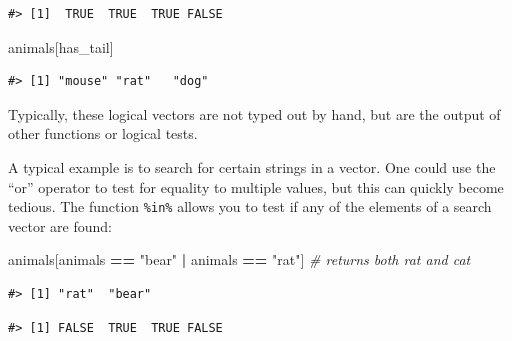 \documentclass[]{book}
\newenvironment{Shaded}{\begin{snugshade}}{\end{snugshade}}
\newcommand{\KeywordTok}[1]{\textcolor[rgb]{0.13,0.29,0.53}{\textbf{#1}}}
\newcommand{\StringTok}[1]{\textcolor[rgb]{0.31,0.60,0.02}{#1}}
\newcommand{\CommentTok}[1]{\textcolor[rgb]{0.56,0.35,0.01}{\textit{#1}}}
\newcommand{\OperatorTok}[1]{\textcolor[rgb]{0.81,0.36,0.00}{\textbf{#1}}}
\newcommand{\NormalTok}[1]{#1}
\theoremstyle{definition}
\theoremstyle{definition}
\theoremstyle{definition}
\theoremstyle{remark}
\begin{document}
\begin{verbatim}
#> [1]  TRUE  TRUE  TRUE FALSE
\end{verbatim}

\begin{Shaded}
\begin{Highlighting}[]
\NormalTok{animals[has_tail]}
\end{Highlighting}
\end{Shaded}

\begin{verbatim}
#> [1] "mouse" "rat"   "dog"
\end{verbatim}

Typically, these logical vectors are not typed out by hand, but are the
output of other functions or logical tests.

A typical example is to search for certain strings in a vector. One
could use the ``or'' operator \texttt{\textbar{}} to test for equality
to multiple values, but this can quickly become tedious. The function
\texttt{\%in\%} allows you to test if any of the elements of a search
vector are found:

\begin{Shaded}
\begin{Highlighting}[]
\NormalTok{animals[animals }\OperatorTok{==}\StringTok{ "bear"} \OperatorTok{|}\StringTok{ }\NormalTok{animals }\OperatorTok{==}\StringTok{ "rat"}\NormalTok{] }\CommentTok{# returns both rat and cat}
\end{Highlighting}
\end{Shaded}

\begin{verbatim}
#> [1] "rat"  "bear"
\end{verbatim}

\begin{Shaded}
\end{Shaded}

\begin{verbatim}
#> [1] FALSE  TRUE  TRUE FALSE
\end{verbatim}

\begin{Shaded}
\end{Shaded}
\end{document}
